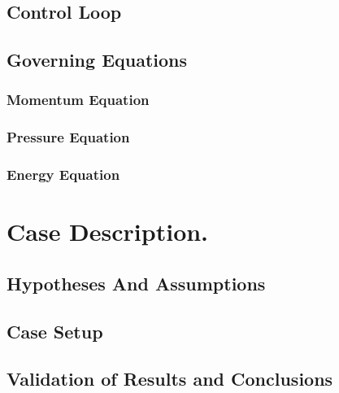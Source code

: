 \subsection{Control Loop}
\subsection{Governing Equations}
\subsubsection{Momentum Equation}
\subsubsection{Pressure Equation}
\subsubsection{Energy Equation}
\section{Case Description.}
\subsection{Hypotheses And Assumptions}
\subsection{Case Setup}
\subsection{Validation of Results and Conclusions}